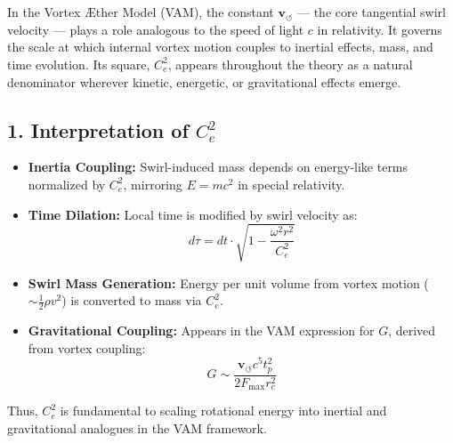 \documentclass[12pt]{article}
\begin{document}
  \titlepageOpen

  \begin{abstract}
      Abstracts are not typically included in appendices, but for standalone it is needed.
  \end{abstract}

  \titlepageClose
\fi


\section{\papertitle}
In the Vortex Æther Model (VAM), the constant \( \mathbf{v}_{\scriptscriptstyle\boldsymbol{\circlearrowleft}} \) --- the core tangential swirl velocity --- plays a role analogous to the speed of light \( c \) in relativity. It governs the scale at which internal vortex motion couples to inertial effects, mass, and time evolution. Its square, \( C_e^2 \), appears throughout the theory as a natural denominator wherever kinetic, energetic, or gravitational effects emerge.

\subsection*{1. Interpretation of \( C_e^2 \)}

\begin{itemize}
    \item \textbf{Inertia Coupling:} Swirl-induced mass depends on energy-like terms normalized by \( C_e^2 \), mirroring \( E = mc^2 \) in special relativity.
    \item \textbf{Time Dilation:} Local time is modified by swirl velocity as:
    \[ d\tau = dt \cdot \sqrt{1 - \frac{\omega^2 r^2}{C_e^2}} \]

    \item \textbf{Swirl Mass Generation:} Energy per unit volume from vortex motion (\( \sim \frac{1}{2} \rho v^2 \)) is converted to mass via \( C_e^2 \).

    \item \textbf{Gravitational Coupling:} Appears in the VAM expression for \( G \), derived from vortex coupling:
    \[ G \sim \frac{\mathbf{v}_{\scriptscriptstyle\boldsymbol{\circlearrowleft}} c^5 t_p^2}{2 F_{\text{max}} r_c^2} \]
\end{itemize}

Thus, \( C_e^2 \) is fundamental to scaling rotational energy into inertial and gravitational analogues in the VAM framework.
\end{document}
